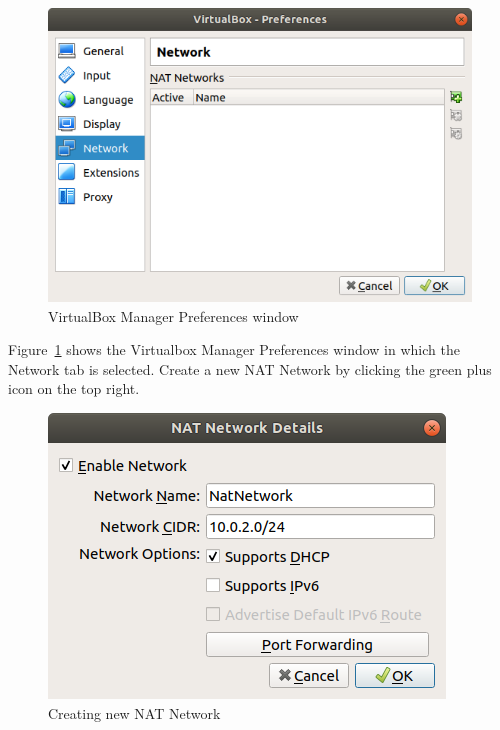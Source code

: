 \documentclass[12pt]{article}
\begin{document}
    
    \begin{figure}[H]
        \begin{center}
            \includegraphics[scale=0.5]{NATNetwork_1.png}
        \end{center}{}
        \caption{VirtualBox Manager Preferences window}
        \label{fig:t1_2}
    \end{figure}
    
    Figure~\ref{fig:t1_2} shows the Virtualbox Manager Preferences window in which the Network tab is selected. Create a new NAT Network by clicking the green plus icon on the top right. 
    
    \begin{figure}[H]
        \begin{center}
            \includegraphics[scale=0.5]{NATNetwork_2.png}
        \end{center}{}
        \caption{Creating new NAT Network}
        \label{fig:t1_3}
    \end{figure}
    
\end{document}
